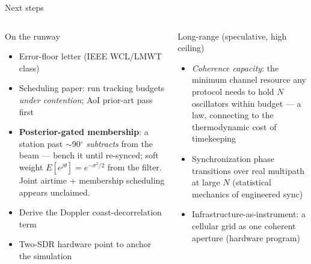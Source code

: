 \documentclass[aspectratio=169,10pt]{beamer}
\begin{document}
\begin{frame}{Next steps}
  \begin{columns}[T]
    \begin{block}{\small On the runway}
      \small
      \begin{itemize}
        \item Error-floor letter (IEEE WCL/LMWT class)
        \item Scheduling paper: run tracking budgets \emph{under
          contention}; AoI prior-art pass first
        \item \textbf{Posterior-gated membership}: a station past
          $\sim$90$^\circ$ \emph{subtracts} from the beam --- bench it
          until re-synced; soft weight
          $E[e^{j\theta}]=e^{-\sigma^2/2}$ from the filter. Joint
          airtime + membership scheduling appears unclaimed.
        \item Derive the Doppler coast-decorrelation term
        \item Two-SDR hardware point to anchor the simulation
      \end{itemize}
    \end{block}
    \begin{block}{\small Long-range (speculative, high ceiling)}
      \small
      \begin{itemize}
        \item \emph{Coherence capacity}: the minimum channel resource
          any protocol needs to hold $N$ oscillators within budget
          --- a law, connecting to the thermodynamic cost of
          timekeeping
        \item Synchronization phase transitions over real multipath
          at large $N$ (statistical mechanics of engineered sync)
        \item Infrastructure-as-instrument: a cellular grid as one
          coherent aperture (hardware program)
      \end{itemize}
    \end{block}
  \end{columns}
\end{frame}
\end{document}
